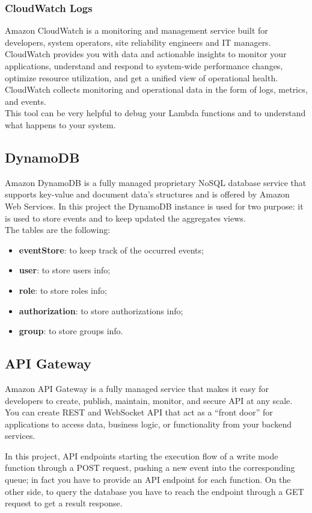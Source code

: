 \subsubsection{CloudWatch Logs}
Amazon CloudWatch is a monitoring and management service built for developers, system operators, site reliability engineers and IT managers. CloudWatch provides you with data and actionable insights to monitor your applications, understand and respond to system-wide performance changes, optimize resource utilization, and get a unified view of operational health. CloudWatch collects monitoring and operational data in the form of logs, metrics, and events. \\
This tool can be very helpful to debug your Lambda functions and to understand what happens to your system.

\subsection{DynamoDB}
Amazon DynamoDB is a fully managed proprietary NoSQL database service that supports key-value and document data's structures and is offered by Amazon Web Services.
In this project the DynamoDB instance is used for two purpose: it is used to store events and to keep updated the aggregates views.\\
The tables are the following:
\begin{itemize}
	\item \textbf{eventStore}: to keep track of the occurred events;
	\item \textbf{user}: to store users info;
	\item \textbf{role}: to store roles info;
	\item \textbf{authorization}: to store authorizations info;
	\item \textbf{group}: to store groups info.
\end{itemize}

\subsection{API Gateway}
Amazon API Gateway is a fully managed service that makes it easy for developers to create, publish, maintain, monitor, and secure API at any scale. You can create REST and WebSocket API that act as a “front door” for applications to access data, business logic, or functionality from your backend services.

In this project, API endpoints starting the execution flow of a write mode function through a POST request, pushing a new event into the corresponding queue; in fact you have to provide an API endpoint for each function. On the other side, to query the database you have to reach the endpoint through a GET request to get a result response.

